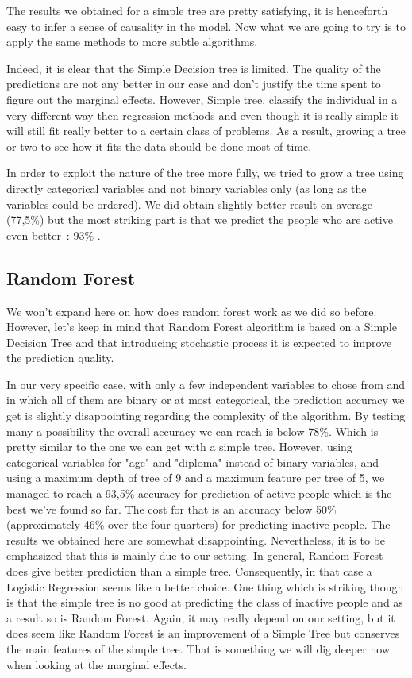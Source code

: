 
The results we obtained for a simple tree are pretty satisfying, it is henceforth easy to infer a sense of causality in the model.
Now what we are going to try is to apply the same methods to more subtle algorithms.

Indeed, it is clear that the Simple Decision tree is limited. The quality of the predictions are not any better in our case and don’t justify the time spent to figure out the marginal effects. However, Simple tree, classify the individual in a very different way then regression methods and even though it is really simple it will still fit really better to a certain class of problems. As a result, growing a tree or two to see how it fits the data should be done most of time.

In order to exploit the nature of the tree more fully, we tried to grow a tree using directly categorical variables and not binary variables only (as long as the variables could be ordered). We did obtain slightly better result on average (77,5\%) but the most striking part is that we predict the people who are active even better : 93\% .

\subsection{Random Forest}

We won’t expand here on how does random forest work as we did so before. However, let’s keep in mind that Random Forest algorithm is based on a Simple Decision Tree and that introducing stochastic process it is expected to improve the prediction quality.

In our very specific case, with only a few independent variables to chose from and in which all of them are binary or at most categorical, the prediction accuracy we get is slightly disappointing regarding the complexity of the algorithm.
By testing many a possibility the overall accuracy we can reach is below 78\%. Which is pretty similar to the one we can get with a simple tree.
However, using categorical variables for "age" and "diploma" instead of binary variables, and using a maximum depth of tree of 9 and a maximum feature per tree of 5, we managed to reach a 93,5\% accuracy for prediction of active people which is the best we’ve found so far. The cost for that is an accuracy below 50\% (approximately 46\% over the four quarters) for predicting inactive people.
The results we obtained here are somewhat disappointing. Nevertheless, it is to be emphasized that this is mainly due to our setting. In general, Random Forest does give better prediction than a simple tree. Consequently, in that case a Logistic Regression seems like a better choice.
One thing which is striking though is that the simple tree is no good at predicting the class of inactive people and as a result so is Random Forest. Again, it may really depend on our setting, but it does seem like Random Forest is an improvement of a Simple Tree but conserves the main features of the simple tree.
That is something we will dig deeper now when looking at the marginal effects.

